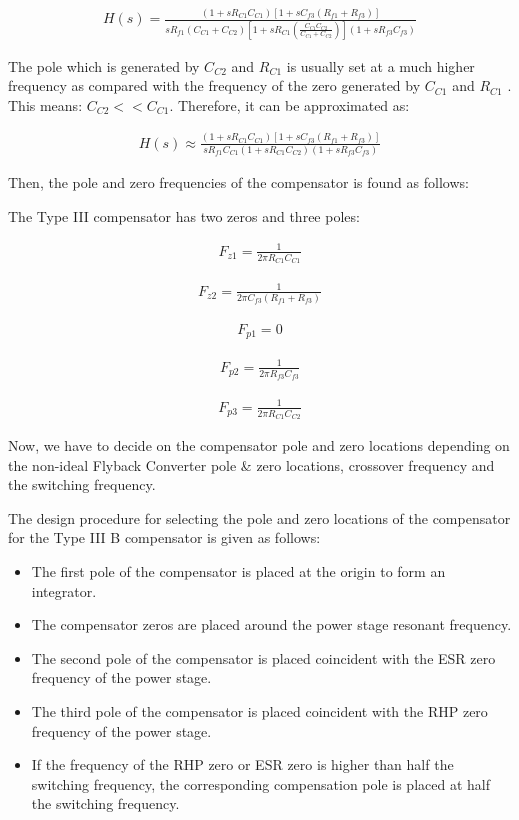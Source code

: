 \begin{align}
    H(s) = \frac{(1+sR_{C1}C_{C1})[1+sC_{f3}(R_{f1}+R_{f3})]}{sR_{f1}(C_{C1}+C_{C2})\left[1 + sR_{C1}\left(\frac{C_{C1}C_{C2}}{C_{C1}+C_{C2}} \right) \right](1+sR_{f3}C_{f3})}
\end{align}

The pole which is generated by $C_{C2}$ and $R_{C1}$ is usually set at a much higher frequency as compared with the frequency of the zero generated by $C_{C1}$ and $R_{C1}$ . This means: $C_{C2} << C_{C1}$. Therefore, it can be approximated as:

\begin{align}
    H(s) \approx \frac{(1+sR_{C1}C_{C1})[1+sC_{f3}(R_{f1}+R_{f3})]}{sR_{f1}C_{C1}(1 + sR_{C1}C_{C2})(1+sR_{f3}C_{f3})}
\end{align}

Then, the pole and zero frequencies of the compensator is found as follows:

The Type III compensator has two zeros and three poles:

\begin{align}
    F_{z1} = \frac{1}{2\pi R_{C1}C_{C1}}
\end{align}

\begin{align}
    F_{z2} = \frac{1}{2\pi C_{f3}(R_{f1}+R_{f3})}
\end{align}

\begin{align}
    F_{p1} = 0
\end{align}

\begin{align}
    F_{p2} = \frac{1}{2\pi R_{f3}C_{f3}}
\end{align}

\begin{align}
    F_{p3} = \frac{1}{2\pi R_{C1}C_{C2}}
\end{align}

Now, we have to decide on the compensator pole and zero locations depending on the non-ideal Flyback Converter pole \& zero locations, crossover frequency and the switching frequency.

The design procedure for selecting the pole and zero locations of the compensator for the Type III B compensator is given as follows:

\begin{itemize}
    \item The first pole of the compensator is placed at the origin to form an integrator.
    \item The compensator zeros are placed around the power stage resonant frequency.
    \item The second pole of the compensator is placed coincident with the ESR zero frequency of the power stage.
    \item The third pole of the compensator is placed coincident with the RHP zero frequency of the power stage.
    \item If the frequency of the RHP zero or ESR zero is higher than half the switching frequency, the corresponding compensation pole is placed at half the switching frequency.
\end{itemize}

